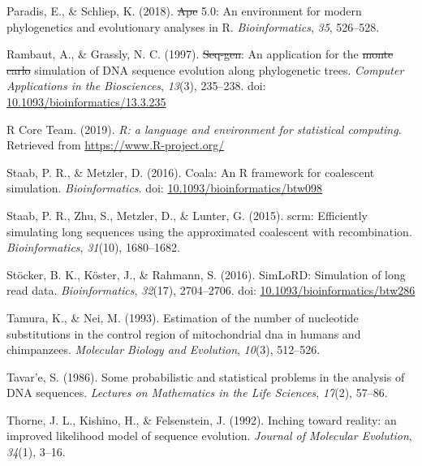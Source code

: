 \documentclass[12pt,]{article}
\providecommand{\DIFaddtex}[1]{{\protect\color{blue}\uwave{#1}}} %
\providecommand{\DIFdeltex}[1]{{\protect\color{red}\sout{#1}}}                      %
\providecommand{\DIFaddbegin}{} %
\providecommand{\DIFaddend}{} %
\providecommand{\DIFdelbegin}{} %
\providecommand{\DIFdelend}{} %
\providecommand{\DIFadd}[1]{\texorpdfstring{\DIFaddtex{#1}}{#1}} %
\providecommand{\DIFdel}[1]{\texorpdfstring{\DIFdeltex{#1}}{}} %
\newcommand{\DIFscaledelfig}{0.5}
\newlength{\DIFdelgraphicswidth} %
\newlength{\DIFdelgraphicsheight} %
\newcommand{\DIFaddincludegraphics}[2][]{{\color{blue}\fbox{\DIFOincludegraphics[#1]{#2}}}} %
\newcommand{\DIFdelincludegraphics}[2][]{%
\sbox{\DIFdelgraphicsbox}{\DIFOincludegraphics[#1]{#2}}%
\settoboxwidth{\DIFdelgraphicswidth}{\DIFdelgraphicsbox} %
\settoboxtotalheight{\DIFdelgraphicsheight}{\DIFdelgraphicsbox} %
\scalebox{\DIFscaledelfig}{%
\parbox[b]{\DIFdelgraphicswidth}{\usebox{\DIFdelgraphicsbox}\\[-\baselineskip] \rule{\DIFdelgraphicswidth}{0em}}\llap{\resizebox{\DIFdelgraphicswidth}{\DIFdelgraphicsheight}{%
\setlength{\unitlength}{\DIFdelgraphicswidth}%
\begin{picture}(1,1)%
\thicklines\linethickness{2pt} %
{\color[rgb]{1,0,0}\put(0,0){\framebox(1,1){}}}%
{\color[rgb]{1,0,0}\put(0,0){\line( 1,1){1}}}%
{\color[rgb]{1,0,0}\put(0,1){\line(1,-1){1}}}%
\end{picture}%
}\hspace*{3pt}}} %
} %
\DeclareRobustCommand{\DIFaddbegin}{\DIFOaddbegin \let\includegraphics\DIFaddincludegraphics} %
\DeclareRobustCommand{\DIFaddend}{\DIFOaddend \let\includegraphics\DIFOincludegraphics} %
\DeclareRobustCommand{\DIFdelbegin}{\DIFOdelbegin \let\includegraphics\DIFdelincludegraphics} %
\DeclareRobustCommand{\DIFdelend}{\DIFOaddend \let\includegraphics\DIFOincludegraphics} %
\begin{document}
\leavevmode\hypertarget{ref-Paradis_2018}{}%
Paradis, E., \& Schliep, K. (2018). \DIFdelbegin \DIFdel{Ape }\DIFdelend \DIFaddbegin \DIFadd{ape }\DIFaddend 5.0: An environment for modern phylogenetics and evolutionary analyses in R. \emph{Bioinformatics}, \emph{35}, 526--528.

\leavevmode\hypertarget{ref-Rambaut_1997}{}%
Rambaut, A., \& Grassly, N. C. (1997). \DIFdelbegin \DIFdel{Seq-gen}\DIFdelend \DIFaddbegin \DIFadd{Seq-Gen}\DIFaddend : An application for the \DIFdelbegin \DIFdel{monte carlo }\DIFdelend \DIFaddbegin \DIFadd{Monte Carlo }\DIFaddend simulation of DNA sequence evolution along phylogenetic trees. \emph{Computer Applications in the Biosciences}, \emph{13}(3), 235--238. doi: \href{https://doi.org/10.1093/bioinformatics/13.3.235}{10.1093/bioinformatics/13.3.235}

\leavevmode\hypertarget{ref-R_Core_Team_2019}{}%
R Core Team. (2019). \emph{R: a language and environment for statistical computing}. Retrieved from \url{https://www.R-project.org/}

\leavevmode\hypertarget{ref-Paul_R._Staab_2016}{}%
Staab, P. R., \& Metzler, D. (2016). Coala: An R framework for coalescent simulation. \emph{Bioinformatics}. doi: \href{https://doi.org/10.1093/bioinformatics/btw098}{10.1093/bioinformatics/btw098}

\leavevmode\hypertarget{ref-Paul_R._Staab_2015}{}%
Staab, P. R., Zhu, S., Metzler, D., \& Lunter, G. (2015). scrm: Efficiently simulating long sequences using the approximated coalescent with recombination. \emph{Bioinformatics}, \emph{31}(10), 1680--1682.

\leavevmode\hypertarget{ref-St_cker_2016}{}%
Stöcker, B. K., Köster, J., \& Rahmann, S. (2016). SimLoRD: Simulation of long read data. \emph{Bioinformatics}, \emph{32}(17), 2704--2706. doi: \href{https://doi.org/10.1093/bioinformatics/btw286}{10.1093/bioinformatics/btw286}

\leavevmode\hypertarget{ref-TN93}{}%
Tamura, K., \& Nei, M. (1993). Estimation of the number of nucleotide substitutions in the control region of mitochondrial dna in humans and chimpanzees. \emph{Molecular Biology and Evolution}, \emph{10}(3), 512--526.

\leavevmode\hypertarget{ref-Tavare_1986gtr}{}%
Tavar\a'e, S. (1986). Some probabilistic and statistical problems in the analysis of DNA sequences. \emph{Lectures on Mathematics in the Life Sciences}, \emph{17}(2), 57--86.

\leavevmode\hypertarget{ref-Thorne_1992}{}%
Thorne, J. L., Kishino, H., \& Felsenstein, J. (1992). Inching toward reality: an improved likelihood model of sequence evolution. \emph{Journal of Molecular Evolution}, \emph{34}(1), 3--16.
\end{document}
